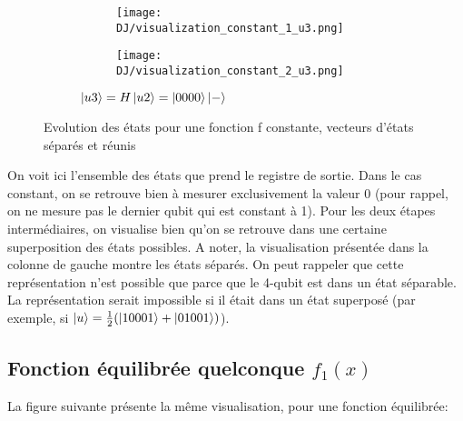 \begin{figure}[ht]
  \begin{subfigure}{0.8\textwidth}
    \centering
    \begin{subfigure}[b]{0.6\textwidth}
      \centering
      \texttt{[image: DJ/visualization\_constant\_1\_u3.png]}
    \end{subfigure}
    \begin{subfigure}[b]{0.25\textwidth}
      \centering
      \texttt{[image: DJ/visualization\_constant\_2\_u3.png]}
    \end{subfigure}
    \caption{$\ket{u3}=H\ket{u2}= \ket{0000}\ket{-}$}
  \end{subfigure}

  \caption{Evolution des états pour une fonction f constante, vecteurs d'états séparés et réunis}
\end{figure}

On voit ici l'ensemble des états que prend le registre de sortie. Dans le cas constant, on se retrouve bien à mesurer exclusivement la valeur 0 (pour rappel, on ne mesure pas le dernier qubit qui est constant à 1). Pour les deux étapes intermédiaires, on visualise bien qu'on se retrouve dans une certaine superposition des états possibles. A noter, la visualisation présentée dans la colonne de gauche montre les états séparés. On peut rappeler que cette représentation n'est possible que parce que le 4-qubit est dans un état séparable. La représentation serait impossible si il était dans un état superposé (par exemple, si $\ket{u} = \frac{1}{2}(\ket{10001} + \ket{01001})$).

\subsection{Fonction équilibrée quelconque $f_1(x)$}
La figure suivante présente la même visualisation, pour une fonction équilibrée:

